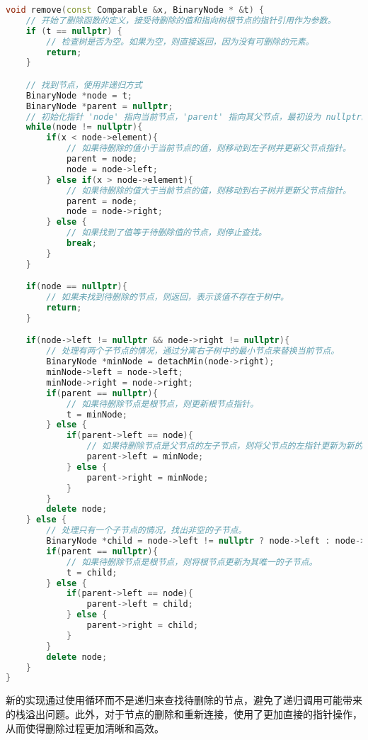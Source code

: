 \documentclass[UTF8]{ctexart}
\begin{document}
\begin{lstlisting}[language=C++]
void remove(const Comparable &x, BinaryNode * &t) {
    // 开始了删除函数的定义，接受待删除的值和指向树根节点的指针引用作为参数。
    if (t == nullptr) {
        // 检查树是否为空。如果为空，则直接返回，因为没有可删除的元素。
        return;
    }

    // 找到节点，使用非递归方式
    BinaryNode *node = t;
    BinaryNode *parent = nullptr;
    // 初始化指针 'node' 指向当前节点，'parent' 指向其父节点，最初设为 nullptr。
    while(node != nullptr){
        if(x < node->element){
            // 如果待删除的值小于当前节点的值，则移动到左子树并更新父节点指针。
            parent = node;
            node = node->left;
        } else if(x > node->element){
            // 如果待删除的值大于当前节点的值，则移动到右子树并更新父节点指针。
            parent = node;
            node = node->right;
        } else {
            // 如果找到了值等于待删除值的节点，则停止查找。
            break;
        }
    }

    if(node == nullptr){
        // 如果未找到待删除的节点，则返回，表示该值不存在于树中。
        return;
    }

    if(node->left != nullptr && node->right != nullptr){
        // 处理有两个子节点的情况，通过分离右子树中的最小节点来替换当前节点。
        BinaryNode *minNode = detachMin(node->right);
        minNode->left = node->left;
        minNode->right = node->right;
        if(parent == nullptr){
            // 如果待删除节点是根节点，则更新根节点指针。
            t = minNode;
        } else {
            if(parent->left == node){
                // 如果待删除节点是父节点的左子节点，则将父节点的左指针更新为新的子节点。
                parent->left = minNode;
            } else {
                parent->right = minNode;
            }
        }
        delete node;
    } else {
        // 处理只有一个子节点的情况，找出非空的子节点。
        BinaryNode *child = node->left != nullptr ? node->left : node->right;
        if(parent == nullptr){
            // 如果待删除节点是根节点，则将根节点更新为其唯一的子节点。
            t = child;
        } else {
            if(parent->left == node){
                parent->left = child;
            } else {
                parent->right = child;
            }
        }
        delete node;
    }
}
\end{lstlisting}

新的实现通过使用循环而不是递归来查找待删除的节点，避免了递归调用可能带来的栈溢出问题。此外，对于节点的删除和重新连接，使用了更加直接的指针操作，从而使得删除过程更加清晰和高效。
\end{document}

